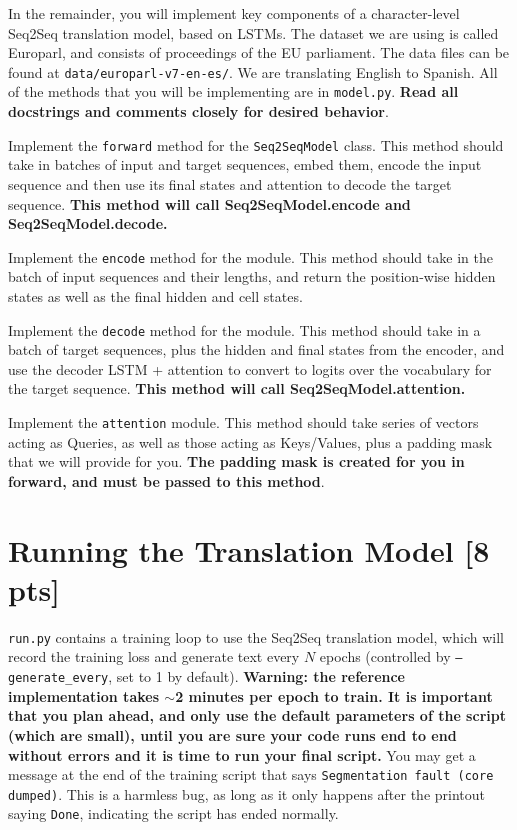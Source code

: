 \documentclass[11pt]{article}
\begin{document}
In the remainder, you will implement key components of a character-level Seq2Seq translation model, based on LSTMs. The dataset we are using is called Europarl, and consists of proceedings of the EU parliament. The data files can be found at \texttt{data/europarl-v7-en-es/}. We are translating English to Spanish. All of the methods that you will be implementing are in \texttt{model.py}. \textbf{Read all docstrings and comments closely for desired behavior}.

\vspace{2em}
 Implement the \texttt{forward} method for the \texttt{Seq2SeqModel} class. This method should take in batches of input and target sequences, embed them, encode the input sequence and then use its final states and attention to decode the target sequence. \textbf{This method will call Seq2SeqModel.encode and Seq2SeqModel.decode.}

\vspace{2em}
 Implement the \texttt{encode} method for the module. This method should take in the batch of input sequences and their lengths, and return the position-wise hidden states as well as the final hidden and cell states.

\vspace{2em}
 Implement the \texttt{decode} method for the module. This method should take in a batch of target sequences, plus the hidden and final states from the encoder, and use the decoder LSTM + attention to convert to logits over the vocabulary for the target sequence. \textbf{This method will call Seq2SeqModel.attention.}

\vspace{2em}
 Implement the \texttt{attention} module. This method should take series of vectors acting as Queries, as well as those acting as Keys/Values, plus a padding mask that we will provide for you. \textbf{The padding mask is created for you in forward, and must be passed to this method}.

\section{Running the Translation Model [8 pts]}

\texttt{run.py} contains a training loop to use the Seq2Seq translation model, which will record the training loss and generate text every $N$ epochs (controlled by \texttt{--generate\_every}, set to 1 by default). \textbf{Warning: the reference implementation takes $\sim$2 minutes per epoch to train. It is important that you plan ahead, and only use the default parameters of the script (which are small), until you are sure your code runs end to end without errors and it is time to run your final script.} You may get a message at the end of the training script that says \texttt{Segmentation fault (core dumped)}. This is a harmless bug, as long as it only happens after the printout saying \texttt{Done}, indicating the script has ended normally.
\end{document}
